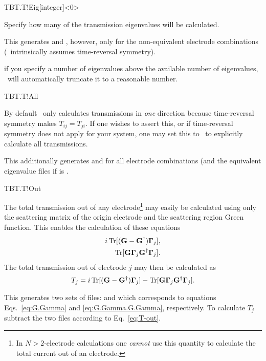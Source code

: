 \begin{fdfentry}{TBT.T!Eig}[integer]<0>

  Specify how many of the transmission eigenvalues will be
  calculated. 

  This generates  and
  , however, only for the non-equivalent
  electrode combinations (\tbtrans\ intrinsically assumes
  time-reversal symmetry).

  \note if you specify a number of eigenvalues above the available
  number of eigenvalues, \tbtrans\ will automatically truncate it to a
  reasonable number.

\end{fdfentry}

\begin{fdflogicalF}{TBT.T!All}

  By default \tbtrans\ only calculates transmissions in \emph{one}
  direction because time-reversal symmetry makes $T_{ij}=T_{ji}$. If
  one wishes to assert this, or if time-reversal symmetry does not
  apply for your system, one may set this to \fdftrue\ to explicitly
  calculate all transmissions.

  This additionally generates  and
   for all electrode combinations (and the
  equivalent eigenvalue files if  is \fdftrue.

\end{fdflogicalF}

\begin{fdflogicalF}{TBT.T!Out}
  
  The total transmission out of any electrode\footnote{In
      $N>2$-electrode calculations one \emph{cannot} use this quantity
      to calculate the total current out of an electrode.} may easily
  be calculated using only the scattering matrix of the origin
  electrode and the scattering region Green function.
  This enables the calculation of these equations
  \begin{align}
    i\operatorname{Tr}[(\mathbf G - \mathbf G^\dagger)\boldsymbol \Gamma_j],
    \label{eq:G.Gamma}
    \\
    \operatorname{Tr}[\mathbf G \boldsymbol \Gamma_j \mathbf G^\dagger\boldsymbol
    \Gamma_j].
    \label{eq:G.Gamma.G.Gamma}
  \end{align}
  The total transmission out of electrode $j$ may then be calculated
  as
  \begin{equation}
    \label{eq:T-out}
    T_j = i\operatorname{Tr}[(\mathbf G - \mathbf G^\dagger)\boldsymbol \Gamma_j] 
    -
    \operatorname{Tr}[\mathbf G \boldsymbol \Gamma_j \mathbf G^\dagger\boldsymbol \Gamma_j].
  \end{equation}

  This generates two sets of files:  and
   which corresponds to equations
  Eqs.~\eqref{eq:G.Gamma} and \eqref{eq:G.Gamma.G.Gamma},
  respectively. To calculate $T_j$ subtract the two files
  according to Eq.~\eqref{eq:T-out}.
  
\end{fdflogicalF}

